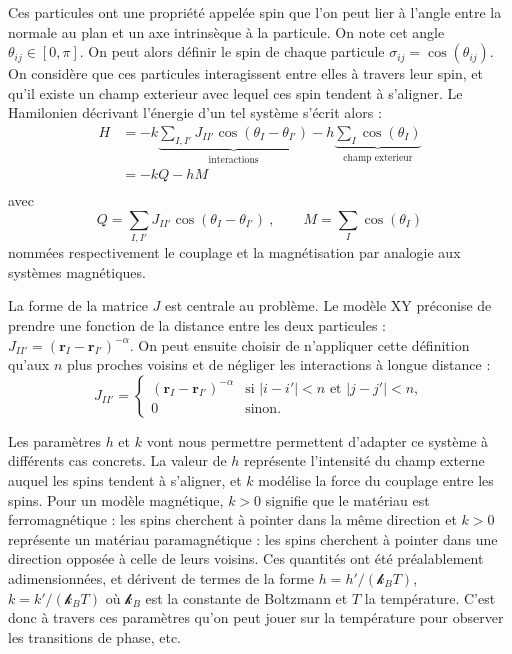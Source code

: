 \documentclass[a4paper, 11pt]{article}
\newcommand{\vr}{\bm{r}}
\newcommand{\kb}{\mathcal{k}_B}
\begin{document}
Ces particules ont une propriété appelée spin que l'on peut lier à l'angle entre la normale au plan
et un axe intrinsèque à la particule. On note cet angle $\theta_{ij} \in [0, \pi]$. On peut alors
définir le spin de chaque particule $\sigma_{ij} = \cos(\theta_{ij})$. On considère que ces
particules interagissent entre elles à travers leur spin, et qu'il existe un champ exterieur avec
lequel ces spin tendent à s'aligner. Le Hamilonien décrivant l'énergie d'un tel système s'écrit
alors : 
\begin{equation}
    \begin{aligned}  
        H &= - k \underbrace{\sum_{I, I'} J_{II'} \cos(\theta_I-\theta_{I'})}_{\text{interactions}} 
        - h \underbrace{\sum_I \cos(\theta_I) }_{\text{champ exterieur}} \\
          &= -k Q - h M \\
    \end{aligned}
\end{equation}
avec
\begin{equation}
    Q = \sum_{I, I'} J_{II'} \cos(\theta_I-\theta_{I'})~, \qquad M = \sum_I \cos(\theta_I) 
\end{equation}
nommées respectivement le couplage et la magnétisation par analogie aux systèmes magnétiques.

La forme de la matrice $J$ est centrale au problème. Le modèle XY préconise de prendre une fonction
de la distance entre les deux particules : $J_{II'} = (\vr_I - \vr_{I'})^{-\alpha}$. On peut ensuite
choisir de n'appliquer cette définition qu'aux $n$ plus proches voisins et de négliger les
interactions à longue distance : 
\begin{equation}
    J_{II'} = 
    \begin{cases}
        (\vr_I - \vr_{I'})^{-\alpha} & \text{si~} |i-i'|<n \text{~et~} |j-j'|<n, \\
        0 & \text{sinon.}
    \end{cases}
\end{equation}

Les paramètres $h$ et $k$ vont nous permettre permettent d'adapter ce système à différents cas
concrets. La valeur de $h$ représente l'intensité du champ externe auquel les spins tendent à
s'aligner, et $k$ modélise la force du couplage entre les spins. Pour un modèle magnétique, $k>0$
signifie que le matériau est ferromagnétique : les spins cherchent à pointer dans la même direction
et $k>0$ représente un matériau paramagnétique : les spins cherchent à pointer dans une direction
opposée à celle de leurs voisins. Ces quantités ont été préalablement adimensionnées, et dérivent de
termes de la forme $h=h'/(\kb T)$, $k = k'/(\kb T)$ où $\kb$ est la constante de Boltzmann et $T$ la
température. C'est donc à travers ces paramètres qu'on peut jouer sur la température pour observer
les transitions de phase, etc. 
\end{document}
